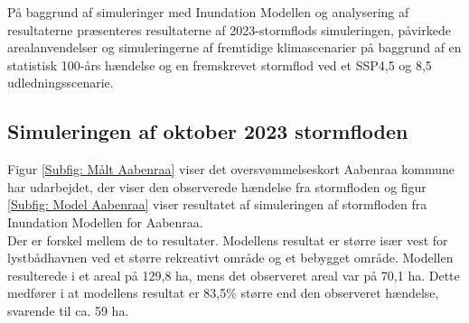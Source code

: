 
På baggrund af simuleringer med Inundation Modellen og analysering af resultaterne præsenteres resultaterne af 2023-stormflods simuleringen, påvirkede arealanvendelser og simuleringerne af fremtidige klimascenarier på baggrund af en statistisk 100-års hændelse og en fremskrevet stormflod ved et SSP4,5 og 8,5 udledningsscenarie. 

\subsection{Simuleringen af oktober 2023 stormfloden}
Figur \ref{Subfig: Målt Aabenraa} viser det oversvømmelseskort Aabenraa kommune har udarbejdet, der viser den observerede hændelse fra stormfloden og figur \ref{Subfig: Model Aabenraa} viser resultatet af simuleringen af stormfloden fra Inundation Modellen for Aabenraa. \\
Der er forskel mellem de to resultater. Modellens resultat er større især vest for lystbådhavnen ved et større rekreativt område og et bebygget område. Modellen resulterede i et areal på 129,8 ha, mens det observeret areal var på 70,1 ha. Dette medfører i at modellens resultat er 83,5\% større end den observeret hændelse, svarende til ca. 59 ha.
